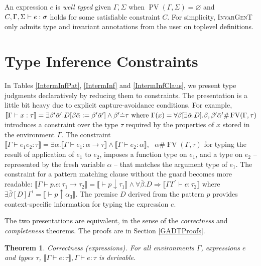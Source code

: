 \documentclass{article}
\newcommand{\assign}{:=}
\newcommand{\tmem}[1]{{\em #1\/}}
\newcommand{\tmname}[1]{\textsc{#1}}
\newcommand{\tmop}[1]{\ensuremath{\operatorname{#1}}}
\newcommand{\tmverbatim}[1]{{\ttfamily{#1}}}
\newtheorem{theorem}{Theorem}
\begin{document}
An expression $e$ is {\tmem{well typed}} given $\Gamma, \Sigma$ when
$\tmop{PV} (\Gamma, \Sigma) = \varnothing$ and $C, \Gamma, \Sigma \vdash e :
{\nobreak} \sigma$ holds for some satisfiable constraint $C$. For simplicity,
{\tmname{InvarGenT}} only admits type and invariant annotations from the user
on toplevel definitions.

\section{Type Inference Constraints}\label{TypInfCns}

In Tables \ref{IntermInfPat}, \ref{IntermInf} and \ref{IntermInfClaus}, we
present type judgments declaratively by reducing them to constraints. The
presentation is a little bit heavy due to explicit capture-avoidance
conditions. For example, $\llbracket \Gamma \vdash x : \tau \rrbracket =
\exists \beta^{\prime} \bar{\alpha}^{\prime} .D [\beta \bar{\alpha} \assign
\beta^{\prime} \bar{\alpha}^{\prime}] \wedge \beta^{\prime} \dot{=} \tau
\text{ where } \Gamma (x) = \forall \beta [\exists \bar{\alpha} .D] . \beta,
\beta^{\prime} \bar{\alpha}^{\prime} \# \tmop{FV} (\Gamma, {\nobreak} \tau)$
introduces a constraint over the type $\tau$ required by the properties of $x$
stored in the environment $\Gamma$. The constraint $\llbracket \Gamma \vdash
e_1 e_2 : \tau \rrbracket = \exists \alpha . \llbracket \Gamma \vdash e_1 :
\alpha \rightarrow \tau \rrbracket \wedge \llbracket \Gamma \vdash e_2 :
\alpha \rrbracket, \text{ \ } \alpha \# \tmop{FV} (\Gamma, \tau)$ for typing
the result of application of $e_1$ to $e_2$, imposes a function type on $e_1$,
and a type on $e_2$ -- represented by the fresh variable $\alpha$ -- that
matches the argument type of $e_1$. The constraint for a pattern matching
clause without the \tmverbatim{when} guard becomes more readable: $\llbracket
\Gamma \vdash p.e : \tau_1 \rightarrow \tau_2 \rrbracket = \llbracket \vdash p
\downarrow \tau_1 \rrbracket \wedge \forall \bar{\beta} .D \Rightarrow
\llbracket \Gamma \Gamma^{\prime} \vdash e : \tau_2 \rrbracket$ where $\exists
\bar{\beta} [D] \Gamma^{\prime} = \llbracket \vdash p \uparrow \alpha_3
\rrbracket$. The premise $D$ derived from the pattern $p$ provides
context-specific information for typing the expression $e$.

The two presentations are equivalent, in the sense of the
{\tmem{correctness}} and {\tmem{completeness}} theorems. The proofs are in
Section \ref{GADTProofs}.

\begin{theorem}
  \label{InfCorrExpr}{\tmem{Correctness}} (expressions). For all environments
  $\Gamma$, expressions $e$ and types $\tau$, $\llbracket \Gamma \vdash e :
  \tau \rrbracket, \Gamma \vdash e : \tau$ is derivable.
\end{theorem}
\end{document}
